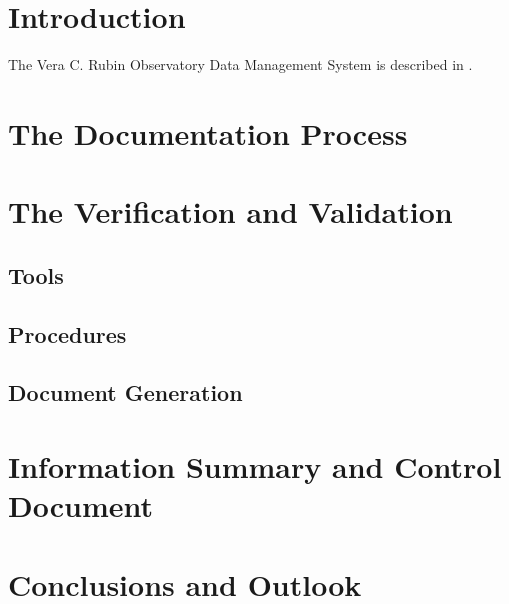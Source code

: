 \section{Introduction}
The Vera C. Rubin Observatory  Data Management System is described in \cite{2015arXiv151207914J}.


\section{The Documentation Process}

\section{The Verification and Validation}

\subsection{Tools}

\subsection{Procedures}

\subsection{Document Generation}

\section{Information Summary and Control Document}

\section{Conclusions and Outlook}
